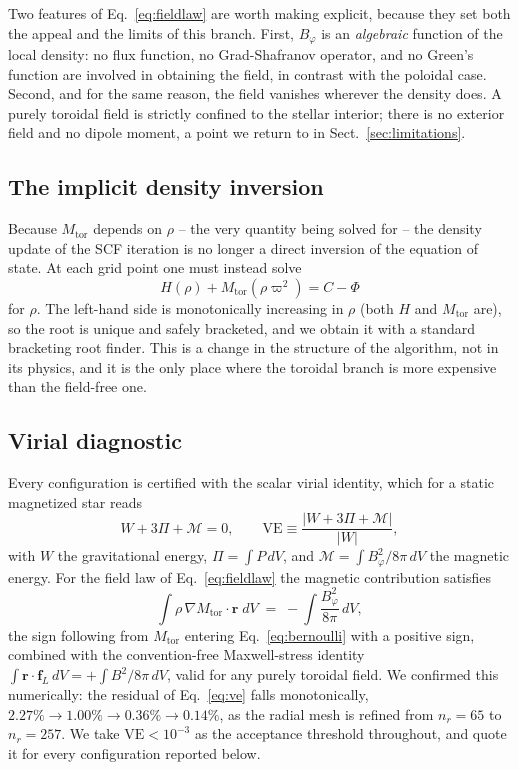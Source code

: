 \documentclass{aa}
\begin{document}
Two features of Eq.~\ref{eq:fieldlaw} are worth making explicit,
because they set both the appeal and the limits of this branch. First,
$B_\varphi$ is an \emph{algebraic} function of the local density: no
flux function, no Grad-Shafranov operator, and no Green's function are
involved in obtaining the field, in contrast with the poloidal case.
Second, and for the same reason, the field vanishes wherever the
density does. A purely toroidal field is strictly confined to the
stellar interior; there is no exterior field and no dipole moment, a
point we return to in Sect.~\ref{sec:limitations}.

\subsection{The implicit density inversion}
\label{sec:implicit}

Because $M_{\mathrm{tor}}$ depends on $\rho$ -- the very quantity being
solved for -- the density update of the SCF iteration is no longer a
direct inversion of the equation of state. At each grid point one must
instead solve
\begin{equation}
H(\rho) + M_{\mathrm{tor}}(\rho\varpi^2) = C - \Phi
\end{equation}
for $\rho$. The left-hand side is monotonically increasing in $\rho$
(both $H$ and $M_{\mathrm{tor}}$ are), so the root is unique and safely
bracketed, and we obtain it with a standard bracketing root finder. This
is a change in the structure of the algorithm, not in its physics, and
it is the only place where the toroidal branch is more expensive than
the field-free one.

\subsection{Virial diagnostic}
\label{sec:virial}

Every configuration is certified with the scalar virial identity, which
for a static magnetized star reads
\begin{equation}
W + 3\Pi + \mathcal{M} = 0, \qquad
\mathrm{VE} \equiv \frac{|W + 3\Pi + \mathcal{M}|}{|W|} ,
\label{eq:ve}
\end{equation}
with $W$ the gravitational energy, $\Pi = \int P\,dV$, and
$\mathcal{M} = \int B_\varphi^2/8\pi\,dV$ the magnetic energy. For the
field law of Eq.~\ref{eq:fieldlaw} the magnetic contribution satisfies
\begin{equation}
\int \rho\, \nabla M_{\mathrm{tor}}\!\cdot\mathbf{r}\; dV
 \;=\; -\int \frac{B_\varphi^2}{8\pi}\, dV ,
\end{equation}
the sign following from $M_{\mathrm{tor}}$ entering
Eq.~\ref{eq:bernoulli} with a positive sign, combined with the
convention-free Maxwell-stress identity
$\int \mathbf{r}\cdot\mathbf{f}_L\,dV = +\int B^2/8\pi\,dV$, valid for
any purely toroidal field. We confirmed this numerically: the residual
of Eq.~\ref{eq:ve} falls monotonically, $2.27\% \rightarrow 1.00\%
\rightarrow 0.36\% \rightarrow 0.14\%$, as the radial mesh is refined
from $n_r = 65$ to $n_r = 257$. We take $\mathrm{VE} < 10^{-3}$ as the
acceptance threshold throughout, and quote it for every configuration
reported below.
\end{document}
